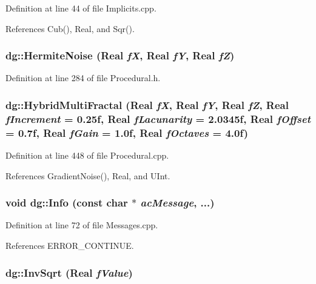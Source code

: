Definition at line 44 of file Implicits.cpp.

References Cub(), Real, and Sqr().
\subsubsection{ dg::Hermite\-Noise ({\bf Real} {\em f\-X}, {\bf Real} {\em f\-Y}, {\bf Real} {\em f\-Z})\hspace{0.3cm}{\tt  [inline]}}\label{namespacedg_a162}




Definition at line 284 of file Procedural.h.
\subsubsection{ dg::Hybrid\-Multi\-Fractal ({\bf Real} {\em f\-X}, {\bf Real} {\em f\-Y}, {\bf Real} {\em f\-Z}, {\bf Real} {\em f\-Increment} = 0.25f, {\bf Real} {\em f\-Lacunarity} = 2.0345f, {\bf Real} {\em f\-Offset} = 0.7f, {\bf Real} {\em f\-Gain} = 1.0f, {\bf Real} {\em f\-Octaves} = 4.0f)}\label{namespacedg_a134}




Definition at line 448 of file Procedural.cpp.

References Gradient\-Noise(), Real, and UInt.
\subsubsection{\setlength{\rightskip}{0pt plus 5cm}void dg::Info (const char $\ast$ {\em ac\-Message}, ...)\hspace{0.3cm}{\tt  [inline]}}\label{namespacedg_a121}




Definition at line 72 of file Messages.cpp.

References ERROR\_\-CONTINUE.
\subsubsection{ dg::Inv\-Sqrt ({\bf Real} {\em f\-Value})\hspace{0.3cm}{\tt  [inline]}}\label{namespacedg_a95}




